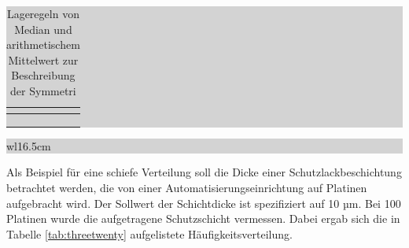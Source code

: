 \begin{table}[H]
\setlength{\arrayrulewidth}{.1em}
\caption{Lageregeln von Median und arithmetischem Mittelwert zur Beschreibung der Symmetri}
\setlength{\fboxsep}{0pt}%
\colorbox{lightgray}{%
%
\begin{tabular}{| c | c |}
\hline
\parbox[c][0.3in][c]{3.3in}{\smallskip\centering\textbf{\selectfont{Lagekennwerte}}} & 
\parbox[c][0.3in][c]{3.3in}{\smallskip\centering\textbf{\selectfont{Symmetrieeigenschaft}}}\\ \hline

\parbox[c][0.3in][c]{3.3in}{\centering{}} & 
\parbox[c][0.3in][c]{3.3in}{\centering{}\selectfont{Rechtsschiefe Verteilung}}\\ \hline

\parbox[c][0.3in][c]{3.3in}{\centering{}} & 
\parbox[c][0.3in][c]{3.3in}{\centering{}\selectfont{Symmetrische Verteilung}}\\ \hline

\parbox[c][0.3in][c]{3.3in}{\centering{}} & 
\parbox[c][0.3in][c]{3.3in}{\centering{}\selectfont{Linksschiefe Verteilung}}\\ \hline

\end{tabular}%
}
\label{tab:threenineteen}
\end{table}

\noindent
\colorbox{lightgray}{%
%
\renewcommand\arraystretch{0.6}%
\begin{tabular}{ wl{16.5cm} }
{\selectfont
{}}
\end{tabular}%
}\bigskip

\noindent Als Beispiel f\"{u}r eine schiefe Verteilung soll die Dicke einer Schutzlackbeschichtung betrachtet werden, die von einer Automatisierungseinrichtung auf Platinen aufgebracht wird. Der Sollwert der Schichtdicke ist spezifiziert auf 10 µm. Bei 100 Platinen wurde die aufgetragene Schutzschicht vermessen. Dabei ergab sich die in Tabelle \ref{tab:threetwenty} aufgelistete H\"{a}ufigkeitsverteilung.

